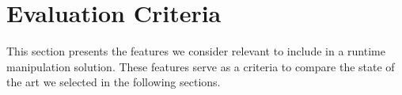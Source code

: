 
\section{Evaluation Criteria}\label{sec:runtime_modification_criteria}

This section presents the features we consider relevant to include in a runtime manipulation solution. These features serve as a criteria to compare the state of the art we selected in the following sections.

